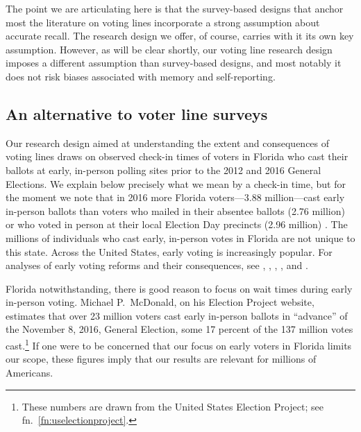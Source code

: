 \documentclass[12pt,titlepage]{article}
\begin{document}
The point we are articulating here is that the survey-based designs
that anchor most the literature on voting lines incorporate a strong
assumption about accurate recall. The research design we offer, of
course, carries with it its own key assumption. However, as will be
clear shortly, our voting line research design imposes a different
assumption than survey-based designs, and most notably it does not
risk biases associated with memory and self-reporting.

\subsection*{An alternative to voter line surveys}

Our research design aimed at understanding the extent and consequences
of voting lines draws on observed check-in times of voters in Florida
who cast their ballots at early, in-person polling sites prior to the
2012 and 2016 General Elections. We explain below precisely what we
mean by a check-in time, but for the moment we note that in 2016 more
Florida voters---3.88 million---cast early in-person ballots than
voters who mailed in their absentee ballots (2.76 million) or who
voted in person at their local Election Day precincts (2.96 million)
\citep{FDOS:2016vote}. The millions of individuals who cast early,
in-person votes in Florida are not unique to this state. Across the
United States, early voting is increasingly popular. For analyses of
early voting reforms and their consequences, see
\citet{neelyrichardson:earlyvoting}, \citet{gronkebaum:growth},
\citet{gronketoffey:psychological}, \citet{gronke:2012}, and
\citet{burdenetal:unanticipated}.




Florida notwithstanding, there is good reason to focus on wait times
during early in-person voting.  Michael P.\ McDonald, on his Election
Project website, estimates that over 23 million voters cast early
in-person ballots in ``advance'' of the November 8, 2016, General
Election, some 17 percent of the 137 million votes
cast.\footnote{These numbers are drawn from the United States Election
  Project; see fn.\ \ref{fn:uselectionproject}.} If one were to be
concerned that our focus on early voters in Florida limits our scope,
these figures imply that our results are relevant for millions of
Americans.
\end{document}
